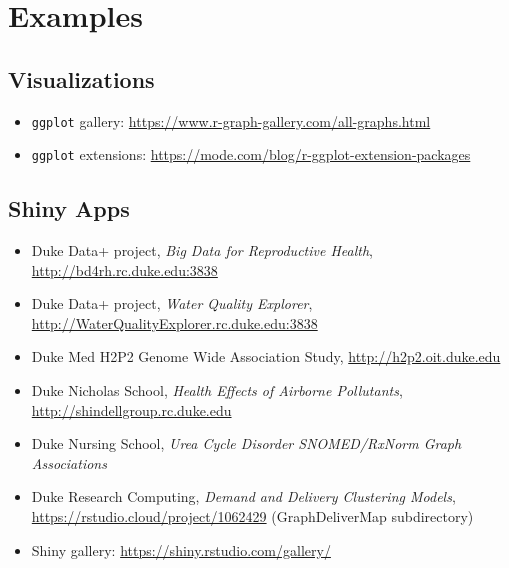 \documentclass[10pt, letterpaper]{article}
\begin{document}
\begin{spacing}{1.0}
\begin{itemize}
\end{itemize}



\section{Examples}\label{sec:examples}

\subsection{Visualizations}\label{sec:examplevis}
\begin{itemize}
  \item \texttt{ggplot} gallery:  \url{https://www.r-graph-gallery.com/all-graphs.html}
  \item \texttt{ggplot} extensions:  \url{https://mode.com/blog/r-ggplot-extension-packages}
\end{itemize}

\subsection{Shiny Apps}\label{sec:exampleapps}
\begin{itemize}
  \item Duke Data+ project, \textit{Big Data for Reproductive Health}, \url{http://bd4rh.rc.duke.edu:3838}
  \item Duke Data+ project, \textit{Water Quality Explorer}, \url{http://WaterQualityExplorer.rc.duke.edu:3838}
  \item Duke Med H2P2 Genome Wide Association Study, \url{http://h2p2.oit.duke.edu}
  \item Duke Nicholas School, \textit{Health Effects of Airborne Pollutants}, \url{http://shindellgroup.rc.duke.edu}
  \item Duke Nursing School, \textit{Urea Cycle Disorder SNOMED/RxNorm Graph Associations}
  \item Duke Research Computing, \textit{Demand and Delivery Clustering Models}, \url{https://rstudio.cloud/project/1062429} (GraphDeliverMap subdirectory)
  \item Shiny gallery:  \url{https://shiny.rstudio.com/gallery/}
\end{itemize}



\end{spacing}
\end{document}
